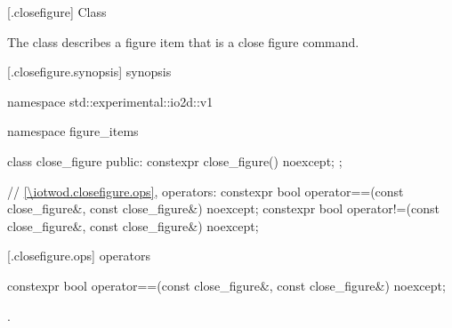  [\iotwod.closefigure] {Class }%

\pnum
{}
The class  describes a figure item that is a close figure command.

 [\iotwod.closefigure.synopsis] { synopsis}%

\begin{codeblock}
namespace std::experimental::io2d::v1 {
  namespace figure_items {
    class close_figure {
    public:
      constexpr close_figure() noexcept;
    };
    
    // \ref{\iotwod.closefigure.ops}, operators:
    constexpr bool operator==(const close_figure&, const close_figure&) noexcept;
    constexpr bool operator!=(const close_figure&, const close_figure&) noexcept;
  }
}
\end{codeblock}

 [\iotwod.closefigure.ops]{ operators}%

%
\begin{itemdecl}
constexpr bool operator==(const close_figure&, const close_figure&) noexcept;
\end{itemdecl}
\begin{itemdescr}
\pnum
\returns
{}.
\end{itemdescr}
